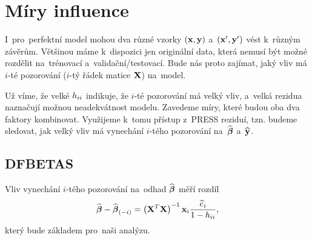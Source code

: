 \section{Míry influence}
I~pro~perfektní model mohou dva různé vzorky $(\mathbf{x},\mathbf{y})$ a~$(\mathbf{x}',\mathbf{y}')$ vést k~různým závěrům. Většinou máme k~dispozici jen originální data, která nemusí být možné rozdělit na~trénovací a~validační/testovací. Bude nás proto zajímat, jaký vliv má $i$-té pozorování ($i$-tý řádek matice $\mathbf{X}$) na~model.

Už víme, že velké $h_{ii}$ indikuje, že $i$-té pozorování má velký vliv, a~velká rezidua naznačují možnou neadekvátnost modelu. Zavedeme míry, které budou oba dva faktory kombinovat. Využijeme k~tomu přístup z~PRESS reziduí, tzn. budeme sledovat, jak velký vliv má vynechání $i$-tého pozorování na~$\widehat{\boldsymbol{\beta}}$ a~$\widehat{\mathbf{y}}$.

\subsection{DFBETAS}
Vliv vynechání $i$-tého pozorování na~odhad $\widehat{\boldsymbol{\beta}}$ měří rozdíl
 $$ \widehat{\boldsymbol{\beta}}-\widehat{\boldsymbol{\beta}}_{(-i)} = \left(\mathbf{X}^T \mathbf{X} \right)^{-1}  \mathbf{x}_i\frac{\widehat{e}_i}{1-h_{ii}}, $$
 který bude základem pro~naši analýzu.

